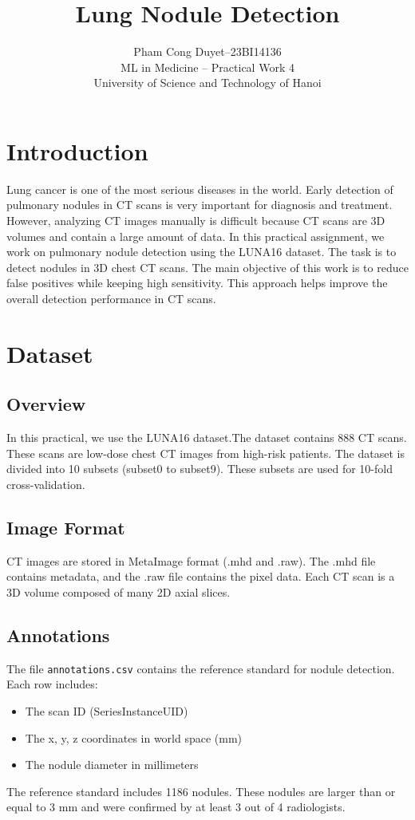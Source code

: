 \documentclass{IEEEtran}
\title{Lung Nodule Detection}
\author{
    Pham Cong Duyet--23BI14136\\
    ML in Medicine -- Practical Work 4\\
    University of Science and Technology of Hanoi
}
\begin{document}
\maketitle

\section{Introduction}
Lung cancer is one of the most serious diseases in the world. Early detection of pulmonary nodules in CT scans is very important for diagnosis and treatment. However, analyzing CT images manually is difficult because CT scans are 3D volumes and contain a large amount of data.
In this practical assignment, we work on pulmonary nodule detection using the LUNA16 dataset. The task is to detect nodules in 3D chest CT scans. 
The main objective of this work is to reduce false positives while keeping high sensitivity. This approach helps improve the overall detection performance in CT scans.
\section{Dataset}
\subsection{Overview}
In this practical, we use the LUNA16 dataset.The dataset contains 888 CT scans. These scans are low-dose chest CT images from high-risk patients.
The dataset is divided into 10 subsets (subset0 to subset9). These subsets are used for 10-fold cross-validation.
\subsection{Image Format}
CT images are stored in MetaImage format (.mhd and .raw). The .mhd file contains metadata, and the .raw file contains the pixel data.
Each CT scan is a 3D volume composed of many 2D axial slices.
\subsection{Annotations}
The file \texttt{annotations.csv} contains the reference standard for nodule detection. Each row includes:
\begin{itemize}
    \item The scan ID (SeriesInstanceUID)
    \item The x, y, z coordinates in world space (mm)
    \item The nodule diameter in millimeters
\end{itemize}
The reference standard includes 1186 nodules. These nodules are larger than or equal to 3 mm and were confirmed by at least 3 out of 4 radiologists.
\end{document}

